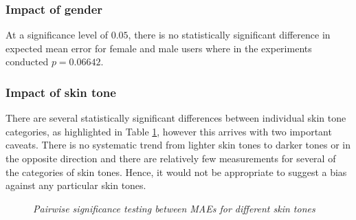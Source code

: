 



\subsubsection{Impact of gender}
At a significance level of $0.05$, there is no statistically significant difference in expected mean error for female and male users where in the experiments conducted $p=0.06642$.
\begin{figure}[H]
    \centering
    \qquad
\end{figure}

\subsubsection{Impact of skin tone}
There are several statistically significant differences between individual skin tone categories, as highlighted in Table \ref{table:skin_tone_p}, however this arrives with two important caveats.
There is no systematic trend from lighter skin tones to darker tones or in the opposite direction and there are relatively few measurements for several of the categories of skin tones.
Hence, it would not be appropriate to suggest a bias against any particular skin tones.
\begin{figure}[H]
    \centering
    \qquad
\end{figure}
\begin{figure}[H]
    \centering
    \scalebox{0.7}{}
    \caption{\textit{Pairwise significance testing between MAEs for different skin tones}}
    \label{table:skin_tone_p}
\end{figure}

